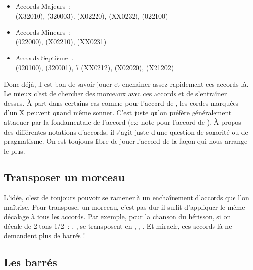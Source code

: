 \documentclass[online]{patacrep}
\begin{document}
\begin{itemize}
\item Accords Majeurs~:\\  (X32010), 
  (320003),  (X02220),  (XX0232), 
  (022100)\\
\item Accords Mineurs~:\\
   (022000),  (X02210),  (XX0231)\\
\item Accords Septième~:\\  (020100), 
  (320001), 7 (XX0212),  (X02020),
   (X21202)\\
\end{itemize}

Donc déjà, il est bon de savoir jouer et enchainer assez rapidement
ces accords là. Le mieux c'est de chercher des morceaux avec ces
accords et de s'entraîner dessus.  À part dans certains cas comme pour
l'accord de , les cordes marquées d'un X peuvent quand
même sonner.  C'est juste qu'on préfère généralement attaquer par la
fondamentale de l'accord (ex: note  pour l'accord de
). À propos des différentes notations d'accords,
il s'agit juste d'une question de sonorité ou de pragmatisme. On est
toujours libre de jouer l'accord de la façon qui nous arrange le plus.

\subsection{Transposer un morceau}

L'idée, c'est de toujours pouvoir se ramener à un enchaînement
d'accords que l'on maîtrise.  Pour transposer un morceau, c'est pas
dur il suffit d'appliquer le même décalage à tous les accords.  Par
exemple, pour la chanson du hérisson, si on décale de 2 tons 1/2~:
, ,  se transposent en
, , .  Et miracle, ces
accords-là ne demandent plus de barrés !

\subsection{Les barrés}
\end{document}
